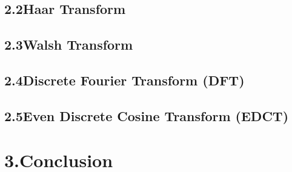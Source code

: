 \documentclass[12pt]{article}
\begin{document}
\subsection*{2.2\quad Haar Transform}


\subsection*{2.3\quad Walsh Transform}


\subsection*{2.4\quad Discrete Fourier Transform (DFT)}


\subsection*{2.5\quad Even Discrete Cosine Transform (EDCT)}




\section*{3.\quad Conclusion}
\end{document}
